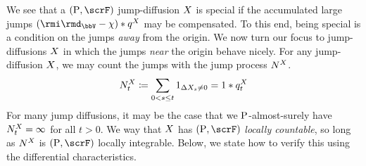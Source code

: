 We see that a $(\Prb, \scrF)$ jump-diffusion $X$ is special if the accumulated large jumps $(\id_\vecSpace - \trunc) \ast \jumpMeas^\X$ may be compensated.
To this end, being special is a condition on the jumps \emph{away} from the origin.
We now turn our focus to jump-diffusions $X$ in which the jumps \emph{near} the origin behave nicely.
For any jump-diffusion $X$, we may count the jumps with the jump process $N^X$.
\begin{equation}
  \label{eq:jump-process}
  N^X_t \coloneqq \sum_{0 < s \leq t} 1_{\Delta X_s \neq 0} = 1 \ast q^X_t
\end{equation}
For many jump diffusions, it may be the case that we ${\operatorname{P}}$-almost-surely have $N^X_t = \infty$ for all $t > 0$.
We way that $X$ has $(\Prb, \scrF)$ \emph{locally countable}, so long as $N^X$ is $(\Prb, \scrF)$ locally integrable.
Below, we state how to verify this using the differential characteristics.


